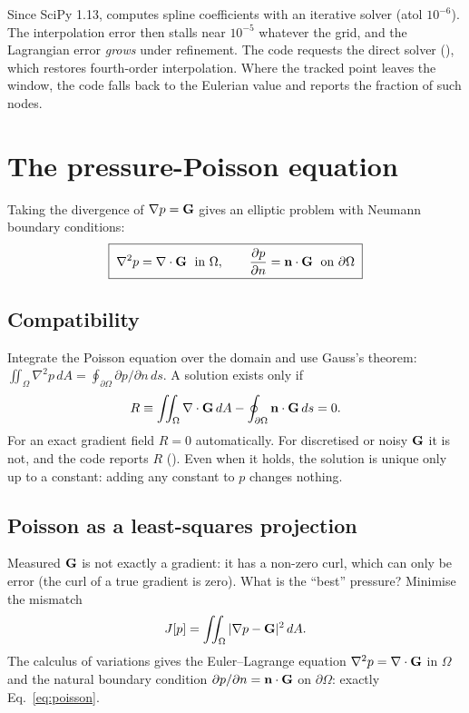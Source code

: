 \begin{pitfall}
Since SciPy 1.13,  computes spline coefficients with an iterative solver (atol $10^{-6}$). The interpolation error then stalls near $10^{-5}$ whatever the grid, and the Lagrangian error \emph{grows} under refinement. The code requests the direct solver (), which restores fourth-order interpolation. Where the tracked point leaves the window, the code falls back to the Eulerian value and reports the fraction of such nodes.
\end{pitfall}

\section{The pressure-Poisson equation}
Taking the divergence of $\nabla p=\mathbf{G}$ gives an elliptic problem with Neumann boundary conditions:
\begin{equation}
\boxed{\;\nabla^2 p = \nabla\cdot\mathbf{G} \;\text{ in }\Omega, \qquad \frac{\partial p}{\partial n}=\mathbf{n}\cdot\mathbf{G} \;\text{ on }\partial\Omega\;}
\label{eq:poisson}
\end{equation}

\subsection{Compatibility}
Integrate the Poisson equation over the domain and use Gauss's theorem: $\iint_\Omega\nabla^2p\,dA=\oint_{\partial\Omega}\partial p/\partial n\,ds$. A solution exists only if
\begin{equation}
R \equiv \iint_\Omega\nabla\cdot\mathbf{G}\,dA-\oint_{\partial\Omega}\mathbf{n}\cdot\mathbf{G}\,ds = 0 .
\end{equation}
For an exact gradient field $R=0$ automatically. For discretised or noisy $\mathbf{G}$ it is not, and the code reports $R$ (). Even when it holds, the solution is unique only up to a constant: adding any constant to $p$ changes nothing.

\subsection{Poisson as a least-squares projection}
Measured $\mathbf{G}$ is not exactly a gradient: it has a non-zero curl, which can only be error (the curl of a true gradient is zero). What is the ``best'' pressure? Minimise the mismatch
\begin{equation}
J[p]=\iint_\Omega|\nabla p-\mathbf{G}|^2\,dA .
\end{equation}
The calculus of variations gives the Euler--Lagrange equation $\nabla^2p=\nabla\cdot\mathbf{G}$ in $\Omega$ and the natural boundary condition $\partial p/\partial n=\mathbf{n}\cdot\mathbf{G}$ on $\partial\Omega$: exactly Eq.~\eqref{eq:poisson}.

